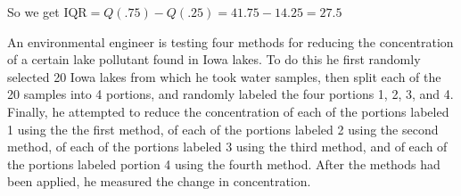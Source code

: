 \documentclass{examsetup}\usepackage[]{graphicx}\usepackage[]{color}
\begin{document}
\begin{questions}
\begin{parts}
\begin{solution}
      So we get $\text{IQR} = Q(.75) - Q(.25) = 41.75 - 14.25 = 27.5$
   \end{solution}

\end{parts}

\question

An environmental engineer is testing four methods for reducing the concentration of a certain lake pollutant found in Iowa lakes.
To do this he first randomly selected 20 Iowa lakes from which he took water samples,
then split each of the 20 samples into 4 portions, 
and randomly labeled the four portions 1, 2, 3, and 4. 
Finally, he attempted to reduce the concentration of each 
of the portions labeled 1 using the the first method, 
of each of the portions labeled 2 using the second method, 
of each of the portions labeled 3 using the third method, 
and of each of the portions labeled portion 4 using the fourth method. 
After the methods had been applied, he measured the change in concentration. \\

\end{questions}
\end{document}
